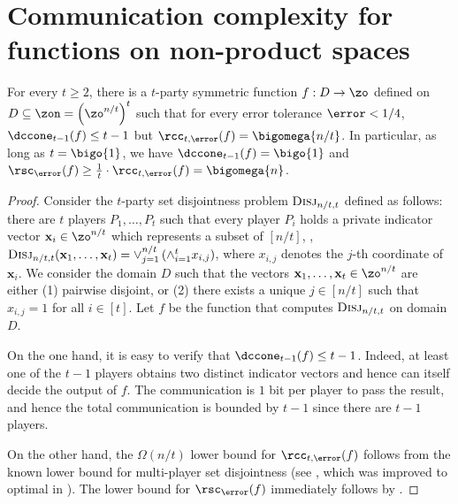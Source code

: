 \section{Communication complexity for functions on non-product spaces}

\begin{theorem}\label{theorem:1-n-separation}
For every $t\ge 2$, there is a $t$-party symmetric function 
$f: D  \to \zo$ 
defined on $D\subseteq \zon= \left(\zo^{n/t} \right)^t$ 
such that for every error tolerance $\error<1/4$, 
$\dccone_{t-1}(f)\le t-1$ but $\rcc_{t,\error}(f)=  \bigomega{ n/t }$. 
In particular, 
as long as $t=\bigo{1}$, we have $\dccone_{t-1}(f) =\bigo{1}$ and $\rsc_\error(f) \ge {\frac{1}{t}\cdot\rcc_{t,\error}(f)} = \bigomega{n}$.
\end{theorem}


\begin{proof}
Consider the $t$-party set disjointness problem $\textsc{Disj}_{n/t,t}$ defined as follows:
there are $t$ players $P_1,\dots, P_t$ such that every player $P_i$ holds a private indicator vector $\mathbf{x}_i\in \zo^{n/t}$ which represents a subset of $[n/t]$, 
\ie,~$\textsc{Disj}_{n/t,t}(\mathbf{x}_1,\dots, \mathbf{x}_t)=\vee_{j=1}^{n/t} \left(\wedge_{i=1}^t x_{i,j}\right)$, where $x_{i,j}$ denotes the $j$-th coordinate of $\mathbf{x}_i$.
We consider the domain $D$ such that the vectors $\mathbf{x}_1,\dots, \mathbf{x}_t\in\zo^{n/t}$ are either
(1) pairwise disjoint, or (2) {\color{black} there exists a unique $j \in [n/t]$ such that $x_{i,j} = 1$ for all $i \in [t]$.}
%
Let $f$ be the function that computes $\textsc{Disj}_{n/t,t}$ on domain $D$.

On the one hand, it is easy to verify that $\dccone_{t-1}(f)\le t-1$. 
Indeed, at least one of the $t-1$ players obtains two distinct indicator vectors and hence can itself decide the output of $f$. 
The communication is $1$ bit per player to pass the result, and hence the total communication is bounded by $t-1$ since there are $t-1$ players.


On the other hand, the $\Omega(n/t)$ lower bound for $\rcc_{t,\error}(f)$ follows from the known lower bound for multi-player set disjointness 
(see \cite{BarYossef:2004eya}, which was improved to optimal in \cite{g09,jayram2009hellinger}). 
The lower bound for $\rsc_\error(f)$ immediately follows by .
\end{proof}






